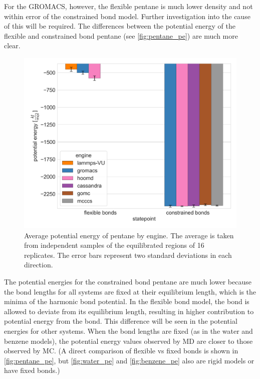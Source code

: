 For the GROMACS, however, the flexible pentane is much lower density and not within error of the constrained bond model.
Further investigation into the cause of this will be required.
The differences between the potential energy of the flexible and constrained bond pentane (see \autoref{fig:pentane_pe}) are much more clear.
\begin{figure}[h!]
    \centering
    \includegraphics[width=0.6\linewidth,keepaspectratio]{figures/rep_study/pentane_pe_summary.png}
    \caption{Average potential energy of pentane by engine. The average is taken from independent samples of the equilibrated regions of 16 replicates. The error bars represent two standard deviations in each direction.}\label{fig:pentane_pe}
\end{figure}
The potential energies for the constrained bond pentane are much lower because the bond lengths for all systems are fixed at their equilibrium length, which is the minima of the harmonic bond potential.
In the flexible bond model, the bond is allowed to deviate from its equilibrium length, resulting in higher contribution to potential energy from the bond. 
This difference will be seen in the potential energies for other systems. 
When the bond lengths are fixed (as in the water and benzene models), the potential energy values observed by MD are closer to those observed by MC. 
(A direct comparison of flexible vs fixed bonds is shown in \autoref{fig:pentane_pe}, but \autoref{fig:water_pe} and \autoref{fig:benzene_pe} also are rigid models or have fixed bonds.)

